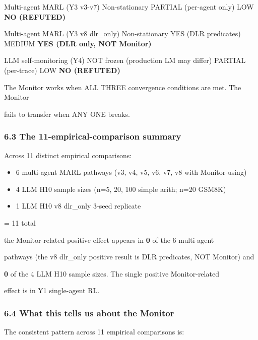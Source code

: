 \documentclass[11pt]{article}
\begin{document}
Multi-agent MARL (Y3 v3-v7) \textbar{} Non-stationary \textbar{} PARTIAL
(per-agent only) \textbar{} LOW \textbar{} \textbf{NO (REFUTED)}
\textbar{}

Multi-agent MARL (Y3 v8 dlr\_only) \textbar{} Non-stationary \textbar{}
YES (DLR predicates) \textbar{} MEDIUM \textbar{} \textbf{YES (DLR only,
NOT Monitor)} \textbar{}

LLM self-monitoring (Y4) \textbar{} NOT frozen (production LM may
differ) \textbar{} PARTIAL (per-trace) \textbar{} LOW \textbar{}
\textbf{NO (REFUTED)} \textbar{}

The Monitor works when ALL THREE convergence conditions are met. The
Monitor

fails to transfer when ANY ONE breaks.

\subsubsection{6.3 The 11-empirical-comparison
summary}\label{the-11-empirical-comparison-summary}

Across 11 distinct empirical comparisons:

\begin{itemize}
\item
  6 multi-agent MARL pathways (v3, v4, v5, v6, v7, v8 with
  Monitor-using)
\item
  4 LLM H10 sample sizes (n=5, 20, 100 simple arith; n=20 GSM8K)
\item
  1 LLM H10 v8 dlr\_only 3-seed replicate
\end{itemize}

= 11 total

the Monitor-related positive effect appears in \textbf{0} of the 6
multi-agent

pathways (the v8 dlr\_only positive result is DLR predicates, NOT
Monitor) and

\textbf{0} of the 4 LLM H10 sample sizes. The single positive
Monitor-related

effect is in Y1 single-agent RL.

\subsubsection{6.4 What this tells us about the
Monitor}\label{what-this-tells-us-about-the-monitor}

The consistent pattern across 11 empirical comparisons is:
\end{document}

